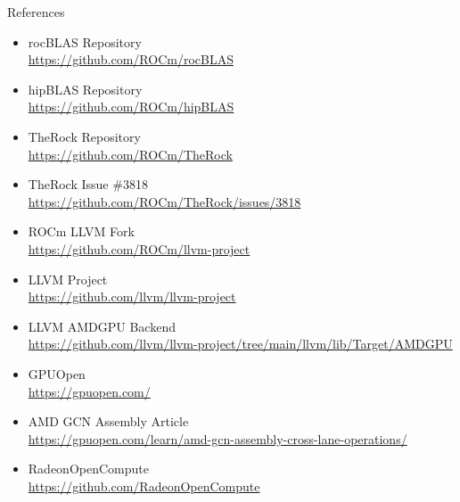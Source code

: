 \documentclass[aspectratio=43,9pt]{beamer}
\begin{document}
\begin{frame}{References}
    \scriptsize
    \begin{itemize}
        \item rocBLAS Repository\\
    \url{https://github.com/ROCm/rocBLAS}

    \item hipBLAS Repository\\
    \url{https://github.com/ROCm/hipBLAS}

    \item TheRock Repository\\
    \url{https://github.com/ROCm/TheRock}

    \item TheRock Issue \#3818\\
    \url{https://github.com/ROCm/TheRock/issues/3818}

    \item ROCm LLVM Fork\\
    \url{https://github.com/ROCm/llvm-project}

    \item LLVM Project\\
    \url{https://github.com/llvm/llvm-project}

    \item LLVM AMDGPU Backend\\
    \url{https://github.com/llvm/llvm-project/tree/main/llvm/lib/Target/AMDGPU}

    \item GPUOpen\\
    \url{https://gpuopen.com/}

    \item AMD GCN Assembly Article\\
    \url{https://gpuopen.com/learn/amd-gcn-assembly-cross-lane-operations/}

    \item RadeonOpenCompute\\
    \url{https://github.com/RadeonOpenCompute}

    
    \end{itemize}
\end{frame}
\end{document}
